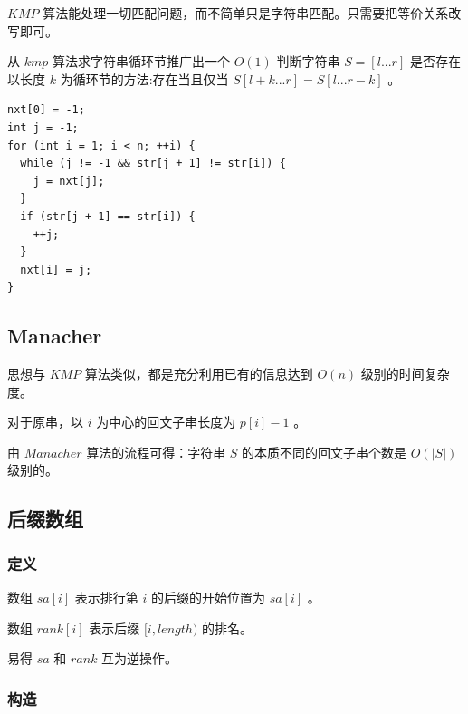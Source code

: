 \documentclass[11pt]{article}
\begin{document}
$KMP$ 算法能处理一切匹配问题，而不简单只是字符串匹配。只需要把等价关系改写即可。

从 $kmp$ 算法求字符串循环节推广出一个 $O(1)$ 判断字符串 $S=[l...r]$ 是否存在以长度 $k$ 为循环节的方法:存在当且仅当 $S[l+k...r]=S[l...r-k]$ 。

\begin{verbatim}
nxt[0] = -1;
int j = -1;
for (int i = 1; i < n; ++i) {
  while (j != -1 && str[j + 1] != str[i]) {
    j = nxt[j];
  }
  if (str[j + 1] == str[i]) {
    ++j;
  }
  nxt[i] = j;
}
\end{verbatim}
\subsection{Manacher}
\label{sec-5-2}

思想与 $KMP$ 算法类似，都是充分利用已有的信息达到 $O(n)$ 级别的时间复杂度。

对于原串，以 $i$ 为中心的回文子串长度为 $p[i]-1$ 。

由 $Manacher$ 算法的流程可得：字符串 $S$ 的本质不同的回文子串个数是 $O(|S|)$ 级别的。

\subsection{后缀数组}
\label{sec-5-3}
\subsubsection{定义}
\label{sec-5-3-1}

数组 $sa[i]$ 表示排行第 $i$ 的后缀的开始位置为 $sa[i]$ 。

数组 $rank[i]$ 表示后缀 $[i,length)$ 的排名。

易得 $sa$ 和 $rank$ 互为逆操作。

\subsubsection{构造}
\label{sec-5-3-2}
\end{document}
